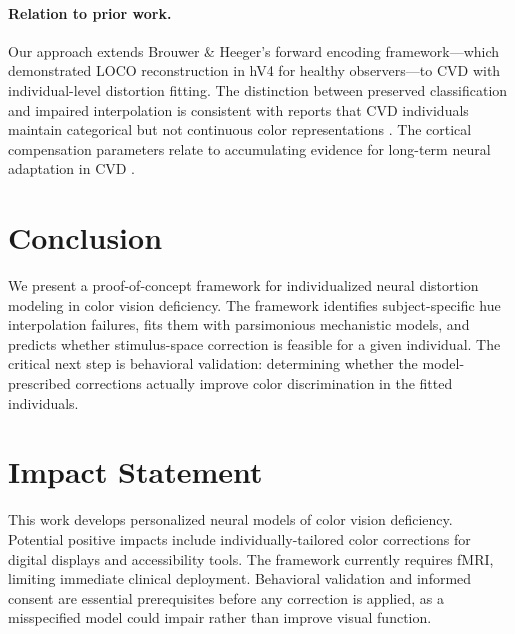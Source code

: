 \documentclass{article}
\begin{document}
\paragraph{Relation to prior work.}
Our approach extends Brouwer \& Heeger's \cite{placeholder_brouwer2009} forward encoding framework---which demonstrated LOCO reconstruction in hV4 for healthy observers---to CVD with individual-level distortion fitting.
The distinction between preserved classification and impaired interpolation is consistent with reports that CVD individuals maintain categorical but not continuous color representations \cite{placeholder_bannert2018}.
The cortical compensation parameters relate to accumulating evidence for long-term neural adaptation in CVD \cite{placeholder_tregillus2021, placeholder_emery2021}.

\section{Conclusion}
\label{sec:conclusion}

We present a proof-of-concept framework for individualized neural distortion modeling in color vision deficiency.
The framework identifies subject-specific hue interpolation failures, fits them with parsimonious mechanistic models, and predicts whether stimulus-space correction is feasible for a given individual.
The critical next step is behavioral validation: determining whether the model-prescribed corrections actually improve color discrimination in the fitted individuals.

\section*{Impact Statement}

This work develops personalized neural models of color vision deficiency.
Potential positive impacts include individually-tailored color corrections for digital displays and accessibility tools.
The framework currently requires fMRI, limiting immediate clinical deployment.
Behavioral validation and informed consent are essential prerequisites before any correction is applied, as a misspecified model could impair rather than improve visual function.
\end{document}
